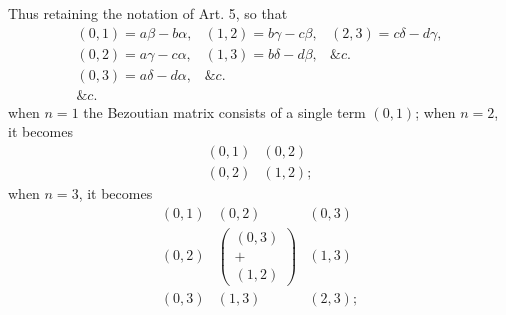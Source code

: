 \documentclass[11pt]{article}
\begin{document}
Thus retaining the notation of Art. 5, so that
\[
\begin{array}{lll}
(0,1)=a\beta-b\alpha, &(1,2)=b\gamma-c\beta, &(2,3)=c\delta-d\gamma,\\
(0,2)=a\gamma-c\alpha, &(1,3)=b\delta-d\beta, &\&c.\\
(0,3)=a\delta-d\alpha, &\&c.&\\
\&c.&&
\end{array}
\]
when $n=1$ the Bezoutian matrix consists of a single term $(0,1)$; when $n=2$, it becomes
\[
\begin{array}{cc}
(0,1)&(0,2)\\
(0,2)&(1,2);
\end{array}
\]
when $n=3$, it becomes
\[
\begin{array}{ccc}
(0,1)&(0,2)&(0,3)\\
(0,2)&\left(\begin{array}{c}(0,3)\\+\\(1,2)\end{array}\right)&(1,3)\\
(0,3)&(1,3)&(2,3);
\end{array}
\]
\end{document}
